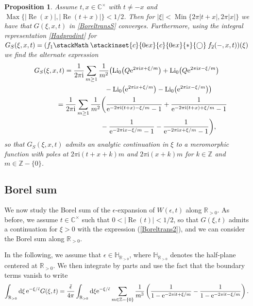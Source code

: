 \documentclass[pdftex]{sigma}
\newcommand\oast{\stackMath\mathbin{\stackinset{c}{0ex}{c}{0ex}{\ast}{\bigcirc}}}
\numberwithin{equation}{section}
\newtheorem{Proposition}[Theorem]{Proposition}
 { \theoremstyle{definition}
\newtheorem{Definition}[Theorem]{Definition}
\newtheorem{Note}[Theorem]{Note}
\newtheorem{Example}[Theorem]{Example}
\newtheorem{Remark}[Theorem]{Remark} }
\begin{document}
\begin{Proposition}
Assume $t,x\in \mathbb{C}^{\times}$ with $t\neq -x$ and $\operatorname{Max}\{|\operatorname{Re}(x)|,|\operatorname{Re}(t+x)|\}<1/2$. Then for $|\xi|<\operatorname{Min}\{2\pi |t+x|,2\pi |x|\}$ we have that $G(\xi,x,t)$ in \eqref{BoreltransS} converges. Furthermore, using the integral representation \eqref{Hadprodint} for $G_S(\xi,x,t)=(f_1\oast f_2(-,x,t))(\xi)$ we find the alternate expression
\begin{gather*}
 G_S(\xi,x,t)
 =\frac{1}{2\pi \mathrm{i}}\sum_{m\geq 1}\frac{1}{m^2}\big(\mathrm{Li}_0\big(Q{\rm e}^{2\pi \mathrm{i} x +\xi/m}\big)+\mathrm{Li}_0\big(Q{\rm e}^{2\pi \mathrm{i} x -\xi/m}\big)\\
 \hphantom{G_S(\xi,x,t)=\frac{1}{2\pi \mathrm{i}}\sum_{m\geq 1}}{}
 -\mathrm{Li}_0\big({\rm e}^{2\pi \mathrm{i} x +\xi/m}\big)-\mathrm{Li}_0\big({\rm e}^{2\pi \mathrm{i} x -\xi/m}\big)\big)\\
\hphantom{G_S(\xi,x,t)}{}
 =\frac{1}{2\pi \mathrm{i}}\sum_{m\geq 1}\frac{1}{m^2}\bigg(\frac{1}{{\rm e}^{-2\pi \mathrm{i}(t+x)-\xi/m}-1}+\frac{1}{{\rm e}^{-2\pi \mathrm{i}(t+x)+\xi/m}-1}\\
 \hphantom{G_S(\xi,x,t)=\frac{1}{2\pi \mathrm{i}}\sum_{m\geq 1}}{}
 -\frac{1}{{\rm e}^{-2\pi \mathrm{i} x-\xi/m}-1}-\frac{1}{{\rm e}^{-2\pi \mathrm{i} x+\xi/m}-1}\bigg),
 \end{gather*}
so that $G_S(\xi,x,t)$ admits an analytic continuation in $\xi$ to a meromorphic function with poles at $2\pi \mathrm{i} (t+x+k)m$ and $2\pi \mathrm{i}(x+k)m$ for $k\in \mathbb{Z}$ and $m\in \mathbb{Z}-\{0\}$.
\end{Proposition}

\subsection{Borel sum}

We now study the Borel sum of the $\epsilon$-expansion of $W(\epsilon,t)$ along $\mathbb{R}_{>0}$. As before, we assume $t\in \mathbb{C}^{\times}$ such that $0<|\operatorname{Re}(t)|<1/2$, so that $G(\xi,t)$ admits a continuation for $\xi>0$ with the expression (\ref{Boreltrans2}), and we can consider the Borel sum along $\mathbb{R}_{>0}$.

In the following, we assume that $\epsilon \in \mathbb{H}_{\mathbb{R}_{>0}}$, where $\mathbb{H}_{\mathbb{R}_{>0}}$ denotes the half-plane centered at $\mathbb{R}_{>0}$. We then integrate by parts and use the fact that the boundary terms vanish to write
\begin{equation*}
 \int_{\mathbb{R}_{>0}} {\rm d} \xi\, {\rm e}^{-\xi/\check{\epsilon}} G(\xi,t)= \frac{\check{\epsilon}}{4\pi}\int_{\mathbb{R}_{>0}}\mathrm{d}\xi {\rm e}^{-\xi/\check{\epsilon}}\sum_{m\in \mathbb{Z}-\{0\}}\frac{1}{m^3}\left(\frac{1}{1-{\rm e}^{-2\pi \mathrm{i} t+\xi/m}}-\frac{1}{1-{\rm e}^{-2\pi \mathrm{i} t-\xi/m}}\right).
\end{equation*}
\end{document}
